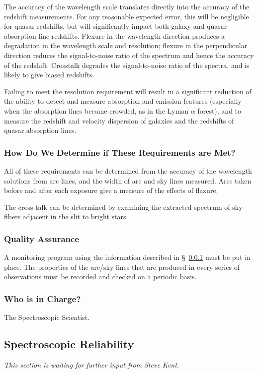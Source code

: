 The accuracy of the wavelength scale translates directly into the
accuracy of the redshift measurements.  For any reasonable expected
error, this will be negligible for quasar redshifts, but will
significantly impact both galaxy and quasar absorption line redshifts. Flexure in
the wavelength direction produces a degradation in the wavelength scale
and resolution; flexure in the perpendicular direction reduces the
signal-to-noise ratio of the spectrum and hence the accuracy of the
redshift. Crosstalk degrades the signal-to-noise ratio of the spectra,
and is likely to give biased redshifts. 

Failing to meet the resolution requirement will result in a
significant reduction of the ability to detect and measure absorption
and emission features (especially when the absorption lines become
crowded, as in the Lyman $\alpha$ forest), and to measure the redshift
and velocity dispersion of galaxies and the redshifts of quasar
absorption lines.

\subsubsection{How Do We Determine if These Requirements are Met?}
\label{sec:resolution-tests}

All of these requirements can be determined from the accuracy of the
wavelength solutions from arc lines, and the width of arc and sky
lines measured.  Arcs taken before and after each exposure give a
measure of the effects of flexure. 

The cross-talk can be determined by examining the extracted spectrum
of sky fibers adjacent in the slit to bright stars.

\subsubsection{Quality Assurance}

A monitoring program using the information described in
\S~\ref{sec:resolution-tests} must be put in place.  The properties
of the arc/sky lines that are produced in every series of observations
must be recorded and checked on a periodic basis.

\subsubsection{Who is in Charge?}
The Spectroscopic Scientist. 

\subsection{Spectroscopic Reliability}
{\it This section is waiting for further input from Steve Kent.}
